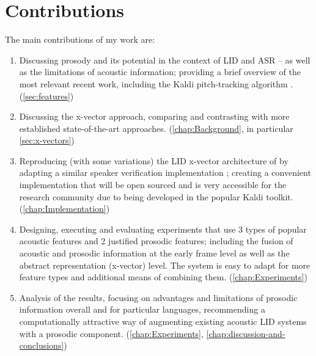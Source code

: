 \documentclass[bsc,frontabs,twoside,singlespacing,parskip,deptreport]{infthesis}
\begin{document}
{  \section{Contributions}{
    The main contributions of my work are:
    \begin{enumerate}
      \item {Discussing prosody and its potential in the context of LID and ASR -- as well as the limitations of acoustic information; providing a brief overview of the most relevant recent work, including the Kaldi pitch-tracking algorithm \citep{Ghahremani_et_al_2014}. (\autoref{sec:features})}
      \item {Discussing the x-vector approach, comparing and contrasting with more established state-of-the-art approaches. (\autoref{chap:Background}, in particular \autoref{sec:x-vectors})}
      \item {Reproducing (with some variations) the LID x-vector architecture of \citet{Snyder_et_al_2018} by adapting a similar speaker verification implementation \citep{Snyder_et_al_2018b}; creating a convenient implementation that will be open sourced and is very accessible for the research community due to being developed in the popular Kaldi toolkit. (\autoref{chap:Implementation})}
      \item {Designing, executing and evaluating experiments that use 3 types of popular acoustic features and 2 justified prosodic features; including the fusion of acoustic and prosodic information at the early frame level as well as the abstract representation (x-vector) level. The system is easy to adapt for more feature types and additional means of combining them. (\autoref{chap:Experiments})}
      \item {Analysis of the results, focusing on advantages and limitations of prosodic information overall and for particular languages, recommending a computationally attractive way of augmenting existing acoustic LID systems with a prosodic component. (\autoref{chap:Experiments}, \autoref{chap:discussion-and-conclusions})}
    \end{enumerate}
  }
}
\end{document}
